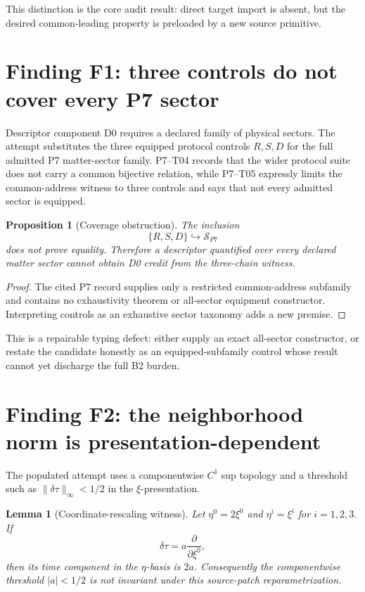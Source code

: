 \documentclass[11pt]{article}
\newtheorem{proposition}{Proposition}
\newtheorem{lemma}{Lemma}
\newcommand{\cS}{\mathcal{S}}
\begin{document}
This distinction is the core audit result: direct target import is absent, but
the desired common-leading property is preloaded by a new source primitive.

\section{Finding F1: three controls do not cover every P7 sector}

Descriptor component D0 requires a declared family of physical sectors.  The
attempt substitutes the three equipped protocol controls
\(R,S,D\) for the full admitted P7 matter-sector family.  P7--T04 records that
the wider protocol suite does not carry a common bijective relation, while
P7--T05 expressly limits the common-address witness to three controls and says
that not every admitted sector is equipped.

\begin{proposition}[Coverage obstruction]
The inclusion
\[
 \{R,S,D\}\hookrightarrow \cS_{P7}
\]
does not prove equality.  Therefore a descriptor quantified over every
declared matter sector cannot obtain D0 credit from the three-chain witness.
\end{proposition}

\begin{proof}
The cited P7 record supplies only a restricted common-address subfamily and
contains no exhaustivity theorem or all-sector equipment constructor.
Interpreting controls as an exhaustive sector taxonomy adds a new premise.
\end{proof}

This is a repairable typing defect: either supply an exact all-sector
constructor, or restate the candidate honestly as an equipped-subfamily
control whose result cannot yet discharge the full B2 burden.

\section{Finding F2: the neighborhood norm is presentation-dependent}

The populated attempt uses a componentwise \(C^1\) sup topology and a
threshold such as \(\lVert \delta\tau\rVert_\infty<1/2\) in the
\(\xi\)-presentation.

\begin{lemma}[Coordinate-rescaling witness]
Let \(\eta^0=2\xi^0\) and \(\eta^i=\xi^i\) for \(i=1,2,3\).  If
\[
 \delta\tau=a\frac{\partial}{\partial \xi^0},
\]
then its time component in the \(\eta\)-basis is \(2a\).  Consequently the
componentwise threshold \(\lvert a\rvert<1/2\) is not invariant under this
source-patch reparametrization.
\end{lemma}
\end{document}
